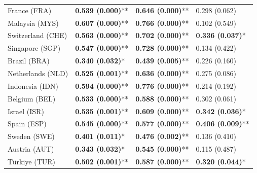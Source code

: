 \begin{longtable}{p{5cm}p{3cm}p{3cm}p{5cm}}
France (FRA) & \textcolor{atlLime600}{\textbf{0.539 (0.000)}**} & \textcolor{atlLime600}{\textbf{0.646 (0.000)}**} & \textcolor{atlOrange600}{0.298 (0.062)} \\
Malaysia (MYS) & \textcolor{atlLime600}{\textbf{0.607 (0.000)}**} & \textcolor{atlLime600}{\textbf{0.766 (0.000)}**} & \textcolor{atlOrange600}{0.102 (0.549)} \\
Switzerland (CHE) & \textcolor{atlLime600}{\textbf{0.563 (0.000)}**} & \textcolor{atlLime600}{\textbf{0.702 (0.000)}**} & \textcolor{atlLime600}{\textbf{0.336 (0.037)}*} \\
Singapore (SGP) & \textcolor{atlLime600}{\textbf{0.547 (0.000)}**} & \textcolor{atlLime600}{\textbf{0.728 (0.000)}**} & \textcolor{atlOrange600}{0.134 (0.422)} \\
Brazil (BRA) & \textcolor{atlLime600}{\textbf{0.340 (0.032)}*} & \textcolor{atlLime600}{\textbf{0.439 (0.005)}**} & \textcolor{atlOrange600}{0.226 (0.160)} \\
Netherlands (NLD) & \textcolor{atlLime600}{\textbf{0.525 (0.001)}**} & \textcolor{atlLime600}{\textbf{0.636 (0.000)}**} & \textcolor{atlOrange600}{0.275 (0.086)} \\
Indonesia (IDN) & \textcolor{atlLime600}{\textbf{0.594 (0.000)}**} & \textcolor{atlLime600}{\textbf{0.776 (0.000)}**} & \textcolor{atlOrange600}{0.214 (0.192)} \\
Belgium (BEL) & \textcolor{atlLime600}{\textbf{0.533 (0.000)}**} & \textcolor{atlLime600}{\textbf{0.588 (0.000)}**} & \textcolor{atlOrange600}{0.302 (0.061)} \\
Israel (ISR) & \textcolor{atlLime600}{\textbf{0.535 (0.001)}**} & \textcolor{atlLime600}{\textbf{0.609 (0.000)}**} & \textcolor{atlLime600}{\textbf{0.342 (0.036)}*} \\
Spain (ESP) & \textcolor{atlLime600}{\textbf{0.545 (0.000)}**} & \textcolor{atlLime600}{\textbf{0.577 (0.000)}**} & \textcolor{atlLime600}{\textbf{0.406 (0.009)}**} \\
Sweden (SWE) & \textcolor{atlLime600}{\textbf{0.401 (0.011)}*} & \textcolor{atlLime600}{\textbf{0.476 (0.002)}**} & \textcolor{atlOrange600}{0.136 (0.410)} \\
Austria (AUT) & \textcolor{atlLime600}{\textbf{0.343 (0.032)}*} & \textcolor{atlLime600}{\textbf{0.545 (0.000)}**} & \textcolor{atlOrange600}{0.115 (0.487)} \\
Türkiye (TUR) & \textcolor{atlLime600}{\textbf{0.502 (0.001)}**} & \textcolor{atlLime600}{\textbf{0.587 (0.000)}**} & \textcolor{atlLime600}{\textbf{0.320 (0.044)}*} \\

\end{longtable}
